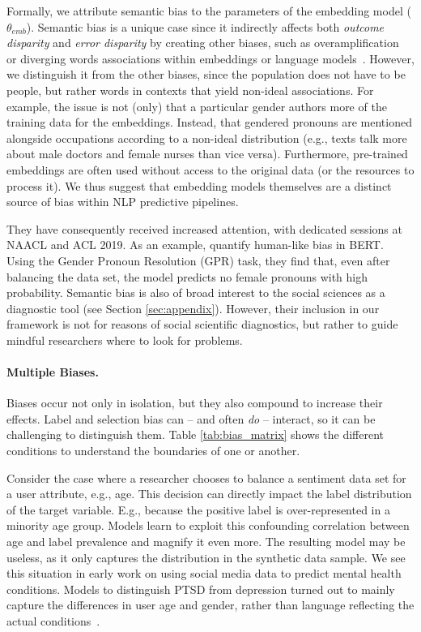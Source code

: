 \documentclass[11pt,a4paper]{article}
\begin{document}
Formally, we attribute semantic bias to the parameters of the embedding model ($\theta_{emb}$).
Semantic bias is a unique case since it indirectly affects both \textit{outcome disparity} and \textit{error disparity} by creating other biases, such as overamplification~\cite{yatskar2016situation,zhao2017men} or diverging words associations within embeddings or language models~\cite{bolukbasi2016man,rudinger2018gender}. 
However, we distinguish it from the other biases, since the population does not have to be people, but rather words in contexts that yield non-ideal associations. 
For example, the issue is not (only) that a particular gender authors more of the training data for the embeddings. Instead, that gendered pronouns are mentioned alongside occupations according to a non-ideal distribution (e.g., texts talk more about male doctors and female nurses than vice versa).
Furthermore, pre-trained embeddings are often used without access to the original data (or the resources to process it). We thus suggest that embedding models themselves are a distinct source of bias within NLP predictive pipelines.

They have consequently received increased attention, with dedicated sessions at NAACL and ACL 2019.
As an example,  quantify human-like bias in BERT. Using the Gender Pronoun Resolution (GPR) task, they find that, even after balancing the data set, the model predicts no female pronouns with high probability. 
Semantic bias is also of broad interest to the social sciences as a diagnostic tool (see Section \ref{sec:appendix}). However, their inclusion in our framework is not for reasons of social scientific diagnostics, but rather to guide mindful researchers where to look for problems.

\paragraph{Multiple Biases.}
Biases occur not only in isolation, but they also compound to increase their effects. Label and selection bias can -- and often \textit{do} -- interact, so it can be challenging to distinguish them. Table \ref{tab:bias_matrix} shows the different conditions to understand the boundaries of one or another. 

Consider the case where a researcher chooses to balance a sentiment data set for a user attribute, e.g., age. This decision can directly impact the label distribution of the target variable. E.g., because the positive label is over-represented in a minority age group. Models learn to exploit this confounding correlation between age and label prevalence and magnify it even more. The resulting model may be useless, as it only captures the distribution in the synthetic data sample.
We see this situation in early work on using social media data to predict mental health conditions. Models to distinguish PTSD from depression turned out to mainly capture the differences in user age and gender, rather than language reflecting the actual conditions~\cite{preoctiuc2015role}.
\end{document}
